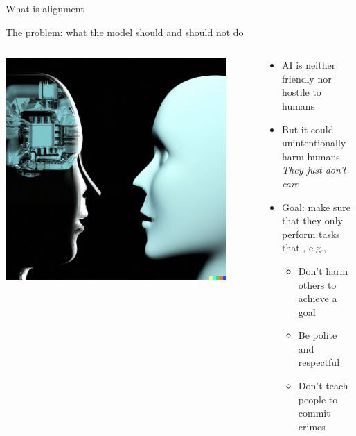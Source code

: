 \documentclass[usenames,dvipsnames,notes,11pt,aspectratio=169,hyperref={colorlinks=true, linkcolor=blue}]{beamer}
\begin{document}
\begin{frame}
    {What is alignment}

    The  problem: what the model should and should not do 

    \bigskip
    \begin{columns}
        \begin{column}{0.4\textwidth}
        \includegraphics[width=0.9\textwidth]{figures/two-ais}
        \end{column}
        \begin{column}{0.6\textwidth}
            \begin{itemize}
                \item AI is neither friendly nor hostile to humans 
                \item But it could unintentionally harm humans\\
                        \textit{They just don't care}
                    \item Goal: make sure that they only perform tasks that , e.g.,
                    \begin{itemize}
                        \item Don't harm others to achieve a goal 
                        \item Be polite and respectful
                        \item Don't teach people to commit crimes 
                    \end{itemize}
            \end{itemize}
        \end{column}
    \end{columns}
\end{frame}
\end{document}
